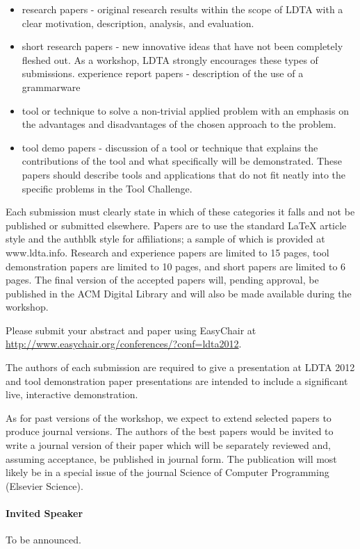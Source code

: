 \documentclass[letterpaper, twocolumn, 9pt]{article}
\begin{document}
\begin{itemize}
  \item research papers - original research results within the scope of LDTA
  with a clear motivation, description, analysis, and evaluation.
\item short research papers - new innovative ideas that have not been
  completely fleshed out. As a workshop, LDTA strongly encourages
  these types of submissions.
  experience report papers - description of the use of a grammarware
\item tool or technique to solve a non-trivial applied problem with an
  emphasis on the advantages and disadvantages of the chosen approach
  to the problem.
\item tool demo papers - discussion of a tool or technique that explains
  the contributions of the tool and what specifically will be
  demonstrated. These papers should describe tools and applications
  that do not fit neatly into the specific problems in the Tool
  Challenge.
\end{itemize}

Each submission must clearly state in which of these categories it
falls and not be published or submitted elsewhere. Papers are to use
the standard LaTeX article style and the authblk style for
affiliations; a sample of which is provided at www.ldta.info. Research
and experience papers are limited to 15 pages, tool demonstration
papers are limited to 10 pages, and short papers are limited to 6
pages. The final version of the accepted papers will, pending
approval, be published in the ACM Digital Library and will also be
made available during the workshop.

Please submit your abstract and paper using EasyChair at
\url{http://www.easychair.org/conferences/?conf=ldta2012}.

The authors of each submission are required to give a presentation at
LDTA 2012 and tool demonstration paper presentations are intended to
include a significant live, interactive demonstration.

As for past versions of the workshop, we expect to extend selected
papers to produce journal versions. The authors of the best papers
would be invited to write a journal version of their paper which will
be separately reviewed and, assuming acceptance, be published in
journal form. The publication will most likely be in a special issue
of the journal Science of Computer Programming (Elsevier Science).

\paragraph{\textsf{Invited Speaker}}
To be announced.
\end{document}
